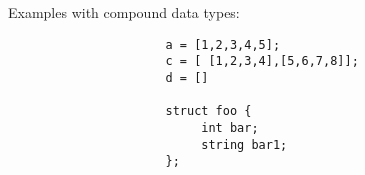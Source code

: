 \documentclass[./LRM_main.tex]{subfiles}
\begin{document}
Examples with compound data types:
\begin{lstlisting}
                      a = [1,2,3,4,5];
		              c = [ [1,2,3,4],[5,6,7,8]];
		              d = []
		              
		              struct foo {
			               int bar;
			               string bar1;
                      };

\end{lstlisting}



\end{document}
